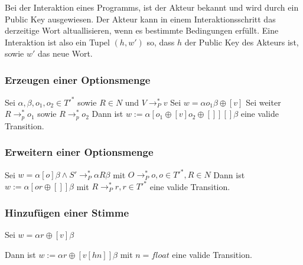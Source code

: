 \documentclass[]{article}
\begin{document}

Bei der Interaktion eines Programms, ist der Akteur bekannt und wird
durch ein Public Key ausgewiesen. Der Akteur kann in einem
Interaktionsschritt das derzeitige Wort altuallisieren, wenn es
bestimmte Bedingungen erfüllt. Eine Interaktion ist also ein Tupel
$(h,w')$ so, dass $h$ der Public Key des Akteurs ist, sowie $w'$ das
neue Wort.

\subsubsection*{Erzeugen einer Optionsmenge}


% 


Sei $\alpha,\beta,o_1,o_2 \in T'^*$ sowie $R\in N$ und
$V \rightarrow_P^* v$ Sei $w=\alpha o_1 \beta \oplus [v]$ Sei weiter
$R\rightarrow_p^* o_1$ sowie $R\rightarrow_p^* o_2$ Dann ist
$w:=\alpha [o_1\oplus [v] o_2\oplus []][]\beta$ eine valide Transition.

\subsubsection*{Erweitern einer Optionsmenge}

Sei $w=\alpha[o]\beta \land S'\rightarrow_P^* \alpha R \beta$ mit
$O\rightarrow_P^* o, o\in T'^*, R\in N$ Dann ist
$w:=\alpha[o r\oplus []]\beta$ mit $R \rightarrow_P^* r, r\in T'^*$ eine
valide Transition.

\subsubsection*{Hinzufügen einer Stimme}

Sei $w=\alpha r\oplus [v]\beta$

Dann ist $w:=\alpha r \oplus [v[h n]]\beta$ mit $n=float$ eine valide
Transition.
\end{document}
